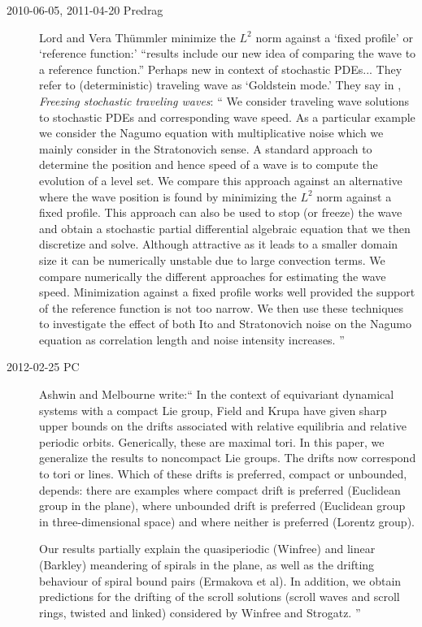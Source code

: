 \begin{description}
\item[2010-06-05, 2011-04-20 Predrag ] Lord and Vera
Th\"ummler
minimize the $L^2$ norm against a
`fixed profile' or `reference function:'
``results include our new idea of comparing the wave to a
reference function.'' Perhaps new in context of stochastic
PDEs...
They refer to
(deterministic) traveling wave as `Goldstein mode.'
												\toCB
They say in ,
{\em Freezing stochastic traveling waves}:
``
 We consider traveling wave solutions to stochastic
PDEs and corresponding wave speed. As a particular example we
consider the Nagumo equation with multiplicative noise which we mainly consider
in the Stratonovich sense. A standard approach to determine the position and
hence speed of a wave is to compute the evolution of a level set. We compare
this approach against an alternative where the wave position is found by
minimizing the $L^2$ norm against a fixed profile. This approach can also be
used to stop (or freeze) the wave and obtain a stochastic partial differential
algebraic equation that we then discretize and solve. Although attractive as it
leads to a smaller domain size it can be numerically unstable due to large
convection terms. We compare numerically the different approaches for
estimating the wave speed. Minimization against a fixed profile works well
provided the support of the reference function is not too narrow. We then use
these techniques to investigate the effect of both Ito and Stratonovich noise
on the Nagumo equation as correlation length and noise intensity increases.
''

\item[2012-02-25 PC]
Ashwin and Melbourne write:``
In the context of equivariant dynamical systems with a compact Lie group,
Field and Krupa have given sharp upper bounds on the
drifts associated with relative equilibria and relative periodic orbits.
Generically, these are maximal tori.
In this paper, we generalize the results to noncompact
Lie groups. The drifts now correspond to tori or lines. Which of these
drifts is preferred, compact or unbounded, depends: there are
examples where compact drift is preferred (Euclidean group in the plane),
where unbounded drift is preferred (Euclidean group in three-dimensional
space) and where neither is preferred (Lorentz group).

Our results partially explain the quasiperiodic (Winfree) and linear
(Barkley) meandering of spirals in the plane, as well as the drifting
behaviour of spiral bound pairs (Ermakova et al). In addition, we obtain
predictions for the drifting of the scroll solutions (scroll waves and
scroll rings, twisted and linked) considered by Winfree and Strogatz.
''


\end{description}

